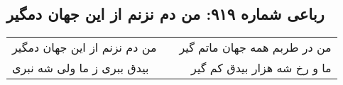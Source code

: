 \begin{center}
\section*{رباعی شماره ۹۱۹: من دم نزنم از این جهان دمگیر}
\label{sec:0919}
\begin{longtable}{l p{0.5cm} r}
من دم نزنم از این جهان دمگیر
&&
من در طربم همه جهان ماتم گیر
\\
بیدق ببری ز ما ولی شه نبری
&&
ما و رخ شه هزار بیدق کم گیر
\\
\end{longtable}
\end{center}
